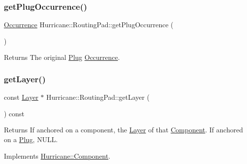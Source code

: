 \subsubsection{\texorpdfstring{get\+Plug\+Occurrence()}{getPlugOccurrence()}}
{\footnotesize\ttfamily \mbox{\hyperlink{classHurricane_1_1Occurrence}{Occurrence}} Hurricane\+::\+Routing\+Pad\+::get\+Plug\+Occurrence (\begin{DoxyParamCaption}{ }\end{DoxyParamCaption})}

\begin{DoxyReturn}{Returns}
The original \mbox{\hyperlink{classHurricane_1_1Plug}{Plug}} \mbox{\hyperlink{classHurricane_1_1Occurrence}{Occurrence}}. 
\end{DoxyReturn}
\mbox{\label{classHurricane_1_1RoutingPad_a7f1e300e4148556fa223e623738d79d4}} 
\subsubsection{\texorpdfstring{get\+Layer()}{getLayer()}}
{\footnotesize\ttfamily const \mbox{\hyperlink{classHurricane_1_1Layer}{Layer}} $\ast$ Hurricane\+::\+Routing\+Pad\+::get\+Layer (\begin{DoxyParamCaption}{ }\end{DoxyParamCaption}) const\hspace{0.3cm}{\ttfamily [virtual]}}

\begin{DoxyReturn}{Returns}
If anchored on a component, the \mbox{\hyperlink{classHurricane_1_1Layer}{Layer}} of that \mbox{\hyperlink{classHurricane_1_1Component}{Component}}. If anchored on a \mbox{\hyperlink{classHurricane_1_1Plug}{Plug}}, {\ttfamily N\+U\+LL}. 
\end{DoxyReturn}


Implements \mbox{\hyperlink{classHurricane_1_1Component_ab451ef19059e6e5bbb77ae391d02a039}{Hurricane\+::\+Component}}.

\mbox{\label{classHurricane_1_1RoutingPad_a5c9c00c648bd0d24e1a8b0876ab442df}} 
